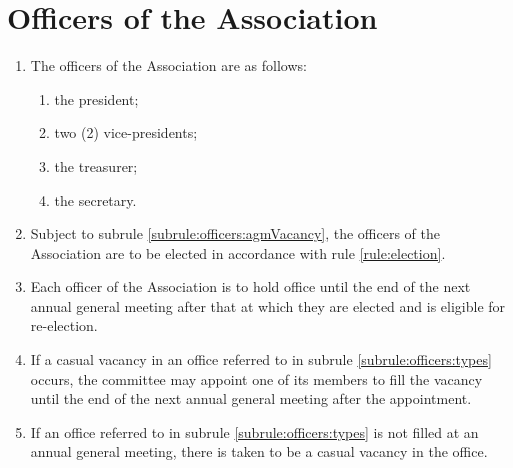 \section{Officers of the Association}
\label{rule:officers}

\begin{enumerate}
	\item \label{subrule:officers:types} The officers of the Association are as follows:
	\begin{enumerate}
		\item the president;
		\item two (2) vice-presidents;
		\item the treasurer;
		\item the secretary.
	\end{enumerate}
	
	\item Subject to subrule \ref{subrule:officers:agmVacancy}, the officers of the Association are to be elected in accordance with rule \ref{rule:election}.
	\item Each officer of the Association is to hold office until the end of the next annual general meeting after that at which they are elected and is eligible for re-election.
	\item \label{subrule:officers:casualVacancy} If a casual vacancy in an office referred to in subrule \ref{subrule:officers:types} occurs, the committee may appoint one of its members to fill the vacancy until the end of the next annual general meeting after the appointment.
	\item \label{subrule:officers:agmVacancy} If an office referred to in subrule \ref{subrule:officers:types} is not filled at an annual general meeting, there is taken to be a casual vacancy in the office.
\end{enumerate}
